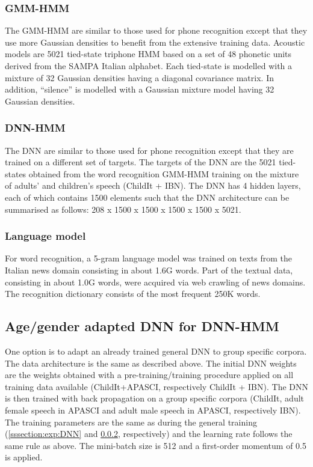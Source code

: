 \documentclass{nle}
\begin{document}
\subsubsection{GMM-HMM}\label{sssection:baseW}

The GMM-HMM are similar to those used for phone recognition except that they use more Gaussian densities to benefit from the extensive training data. Acoustic models  are 5021 tied-state  triphone HMM
based on  a set of  48 phonetic units  derived from the  SAMPA Italian
alphabet. Each tied-state is modelled with  a mixture of  32 Gaussian
densities   having  a  diagonal   covariance  matrix. In  addition,
``silence''  is  modelled  with  a  Gaussian mixture  model  having  32
Gaussian densities.


\subsubsection{DNN-HMM}\label{sssection:exp:DNNW}
The DNN  are similar to those  used for phone  recognition except that
they are  trained on a different  set of targets. The  targets of the
DNN are the 5021 tied-states obtained from the word recognition GMM-HMM training on the
mixture of adults' and children's  speech (ChildIt + IBN). The DNN has
4 hidden  layers, each of which  contains 1500 elements  such that the
DNN architecture  can be summarised  as follows: 208  x 1500 x  1500 x
1500 x 1500 x 5021.

\subsubsection{Language model}
For word  recognition, a  5-gram language model  was trained  on texts
from the Italian  news domain consisting in about  1.6G words. Part of
the textual  data, consisting in  about 1.0G words, were  acquired via
web crawling of news  domains.  The recognition dictionary consists of
the most frequent 250K words.

\subsection{Age/gender adapted DNN for DNN-HMM}
One option is to adapt an already trained general DNN  to group specific corpora. The data architecture is the same as described above. The initial DNN weights are the weights obtained with a pre-training/training procedure applied on all training data available  (ChildIt+APASCI, respectively ChildIt + IBN). The DNN is then trained with back propagation on a group specific corpora (ChildIt, adult female speech in APASCI and adult male speech in APASCI, respectively IBN). The training parameters are the same as during the general training (\ref{sssection:exp:DNN} and \ref{sssection:exp:DNNW}, respectively) and the learning rate follows the same rule as above. The mini-batch size is 512 and a first-order momentum of 0.5 is applied.
\end{document}
